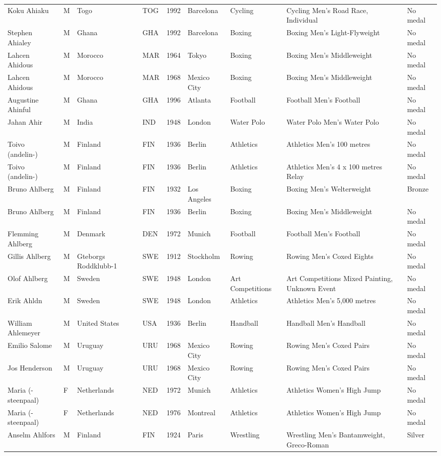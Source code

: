 \documentclass{article}%
\begin{document}
\begin{longtable}{l l l l l l l l l}
Koku Ahiaku&M&Togo&TOG&1992&Barcelona&Cycling&Cycling Men's Road Race, Individual&No medal\\%
Stephen Ahialey&M&Ghana&GHA&1992&Barcelona&Boxing&Boxing Men's Light{-}Flyweight&No medal\\%
Lahcen Ahidous&M&Morocco&MAR&1964&Tokyo&Boxing&Boxing Men's Middleweight&No medal\\%
Lahcen Ahidous&M&Morocco&MAR&1968&Mexico City&Boxing&Boxing Men's Middleweight&No medal\\%
Augustine Ahinful&M&Ghana&GHA&1996&Atlanta&Football&Football Men's Football&No medal\\%
Jahan Ahir&M&India&IND&1948&London&Water Polo&Water Polo Men's Water Polo&No medal\\%
Toivo (andelin{-})&M&Finland&FIN&1936&Berlin&Athletics&Athletics Men's 100 metres&No medal\\%
Toivo (andelin{-})&M&Finland&FIN&1936&Berlin&Athletics&Athletics Men's 4 x 100 metres Relay&No medal\\%
Bruno Ahlberg&M&Finland&FIN&1932&Los Angeles&Boxing&Boxing Men's Welterweight&Bronze\\%
Bruno Ahlberg&M&Finland&FIN&1936&Berlin&Boxing&Boxing Men's Middleweight&No medal\\%
Flemming Ahlberg&M&Denmark&DEN&1972&Munich&Football&Football Men's Football&No medal\\%
Gillis Ahlberg&M&Gteborgs Roddklubb{-}1&SWE&1912&Stockholm&Rowing&Rowing Men's Coxed Eights&No medal\\%
Olof Ahlberg&M&Sweden&SWE&1948&London&Art Competitions&Art Competitions Mixed Painting, Unknown Event&No medal\\%
Erik Ahldn&M&Sweden&SWE&1948&London&Athletics&Athletics Men's 5,000 metres&No medal\\%
William Ahlemeyer&M&United States&USA&1936&Berlin&Handball&Handball Men's Handball&No medal\\%
Emilio Salome&M&Uruguay&URU&1968&Mexico City&Rowing&Rowing Men's Coxed Pairs&No medal\\%
Jos Henderson&M&Uruguay&URU&1968&Mexico City&Rowing&Rowing Men's Coxed Pairs&No medal\\%
Maria ({-}steenpaal)&F&Netherlands&NED&1972&Munich&Athletics&Athletics Women's High Jump&No medal\\%
Maria ({-}steenpaal)&F&Netherlands&NED&1976&Montreal&Athletics&Athletics Women's High Jump&No medal\\%
Anselm Ahlfors&M&Finland&FIN&1924&Paris&Wrestling&Wrestling Men's Bantamweight, Greco{-}Roman&Silver\\%

\end{longtable}
\end{document}
